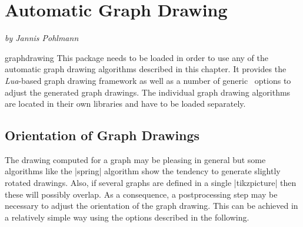 %
%
%

\section{Automatic Graph Drawing}
\label{section-library-graphdrawing-algorithms}

{\emph{by Jannis Pohlmann}}

\begin{tikzlibrary}{graphdrawing}
  This package needs to be loaded in order to use any of the automatic
  graph drawing algorithms described in this chapter. It provides the
  \emph{Lua}-based graph drawing framework as well as a number of 
  generic \tikzname\ options to adjust the generated graph drawings.
  The individual graph drawing algorithms are located in their own
  libraries and have to be loaded separately.
\end{tikzlibrary}

\subsection{Orientation of Graph Drawings}

The drawing computed for a graph may be pleasing in general but some
algorithms like the |spring| algorithm show the tendency to generate
slightly rotated drawings. Also, if several graphs are defined in a
single |{tikzpicture}| then these will possibly overlap.
As a consequence, a postprocessing step may be necessary to adjust the
orientation of the graph drawing. This can be achieved in a relatively
simple way using the options described in the following.

